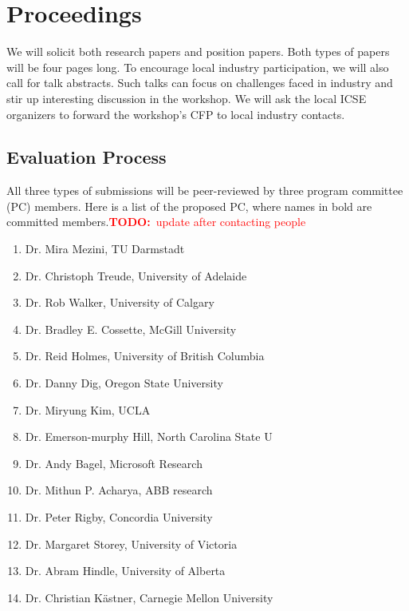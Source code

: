 \documentclass[10pt, conference]{IEEEtran}
\newcommand{\todo}[1]{{\textcolor{red}{\textbf{TODO:}~#1}}}
\begin{document}
\section{Proceedings}

We will solicit both research papers and position papers. Both types of papers will be four pages long. To encourage local industry participation, we will also call for talk abstracts. Such talks can focus on challenges faced in industry and stir up interesting discussion in the workshop. We will ask the local ICSE organizers to forward the workshop's CFP to local industry contacts.

\subsection{Evaluation Process}
All three types of submissions will be peer-reviewed by three program committee (PC) members. Here is a list of the proposed PC, where names in bold are committed members.\todo{update after contacting people}

\begin{enumerate}
\item Dr. Mira Mezini, TU Darmstadt
\item Dr. Christoph Treude, University of Adelaide 
\item Dr. Rob Walker, University of Calgary
\item Dr. Bradley E. Cossette, McGill University
\item Dr. Reid Holmes, University of British Columbia
\item Dr. Danny Dig, Oregon State University
\item Dr. Miryung Kim, UCLA
\item Dr. Emerson-murphy Hill, North Carolina State U
\item Dr. Andy Bagel, Microsoft Research
\item Dr. Mithun P. Acharya, ABB research
\item Dr. Peter Rigby, Concordia University
\item Dr. Margaret Storey, University of Victoria
\item Dr. Abram Hindle, University of Alberta
\item Dr. Christian K\"{a}stner, Carnegie Mellon University
\end{enumerate}
\end{document}
